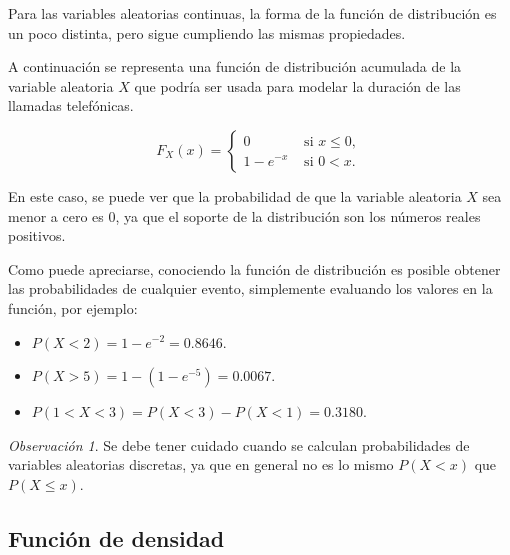\documentclass[
  us-letterpaper,
]{scrreprt}
\theoremstyle{plain}
\theoremstyle{definition}
\theoremstyle{definition}
\theoremstyle{plain}
\theoremstyle{remark}
\newtheorem*{remark}{Observación}
\begin{document}
\begin{tcolorbox}[enhanced jigsaw, bottomtitle=1mm, coltitle=black, breakable, leftrule=.75mm, left=2mm, rightrule=.15mm, titlerule=0mm, toprule=.15mm, toptitle=1mm, colback=white, colframe=quarto-callout-caution-color-frame, title={Ejemplo (\textbf{\emph{Duración de una llamada telefónica}})}, colbacktitle=quarto-callout-caution-color!10!white, arc=.35mm, bottomrule=.15mm, opacitybacktitle=0.6, opacityback=0]

Para las variables aleatorias continuas, la forma de la función de
distribución es un poco distinta, pero sigue cumpliendo las mismas
propiedades.

A continuación se representa una función de distribución acumulada de la
variable aleatoria \(X\) que podría ser usada para modelar la duración
de las llamadas telefónicas.

\[ F_X(x)=\begin{cases}0 & \text{ si } x\leq 0,\\ 1-e^{-x} & \text{ si } 0< x.\end{cases} \]

En este caso, se puede ver que la probabilidad de que la variable
aleatoria \(X\) sea menor a cero es 0, ya que el soporte de la
distribución son los números reales positivos.

Como puede apreciarse, conociendo la función de distribución es posible
obtener las probabilidades de cualquier evento, simplemente evaluando
los valores en la función, por ejemplo:

\begin{itemize}
\item
  \(P(X<2)=1-e^{-2}=0.8646\).
\item
  \(P(X>5)=1-(1-e^{-5})=0.0067\).
\item
  \(P(1<X<3)=P(X<3)-P(X<1)=0.3180\).
\end{itemize}

\end{tcolorbox}

\begin{remark}
Se debe tener cuidado cuando se calculan probabilidades de variables
aleatorias discretas, ya que en general no es lo mismo \(P(X< x)\) que
\(P(X\leq x)\).
\end{remark}

\subsection{Función de densidad}\label{funciuxf3n-de-densidad}
\end{document}

